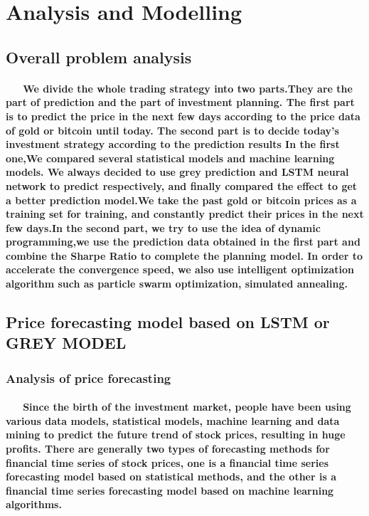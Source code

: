 \documentclass{mcmthesis}
\begin{document}
	\section{Analysis and Modelling}\cite{ML}
	\subsection{Overall problem analysis}
	\paragraph{\ \ \ We divide the whole trading strategy into two parts.They are the part of prediction and the part of investment planning.
		The first part is to predict the price in the next few days according to the price data of gold or bitcoin until today.
		The second part is to decide today's investment strategy according to the prediction results
		In the first one,We compared several statistical models and machine learning models. We always decided 
		to use grey prediction and LSTM neural network to predict respectively, 
		and finally compared the effect to get a better prediction model.We take the past gold or bitcoin prices as a training set for training, 
		and constantly predict their prices in the next few days.In the second part, we try to use the idea of 
		dynamic programming,we use the prediction data obtained in the first part and combine the Sharpe Ratio
		to complete the planning model. In order to accelerate the convergence speed, we also use intelligent 
		optimization algorithm such as particle swarm optimization, simulated annealing.}
	
	
	\subsection{Price forecasting model based on LSTM or GREY MODEL}
	\subsubsection{Analysis of price forecasting}
	\paragraph{\ \ \ Since the birth of the investment market, people have been using various data models, statistical models, machine learning and data mining to predict the future trend of stock prices,
		resulting in huge profits.
		There are generally two types of forecasting methods for financial time series of stock prices, one is a financial time series forecasting model based on statistical methods, and the other is a financial time series forecasting model based on machine learning algorithms.}
\end{document}
